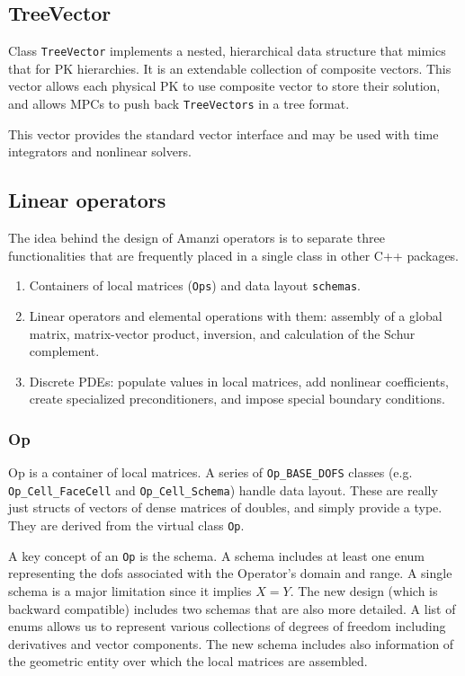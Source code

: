 \subsection{TreeVector}
Class {\tt TreeVector} implements a nested, hierarchical data structure 
that mimics that for PK hierarchies.
It is an extendable collection of composite vectors.
This vector allows each physical PK to use composite vector to store 
their solution, and allows MPCs to push back {\tt TreeVectors} in a tree format.

This vector provides the standard vector interface and may be used with
time integrators and nonlinear solvers.


\subsection{Linear operators}
The idea behind the design of Amanzi operators is to separate three 
functionalities that are frequently placed in a single class in other
C++ packages.

\begin{enumerate}
\item Containers of local matrices ({\tt Ops}) and data layout {\tt schemas}.

\item Linear operators and elemental operations with them: assembly of a global 
      matrix, matrix-vector product, inversion, and calculation of the Schur complement.

\item Discrete PDEs: populate values in local matrices, add nonlinear 
coefficients, create specialized preconditioners, and impose special
boundary conditions. 
\end{enumerate}


\subsubsection{Op}
Op is a container of local matrices.
A series of {\tt Op\_BASE\_DOFS} classes (e.g. {\tt Op\_Cell\_FaceCell} and 
{\tt Op\_Cell\_Schema}) handle data layout. 
These are really just structs of vectors of
dense matrices of doubles, and simply provide a type.
They are derived from the virtual class {\tt Op}.

A key concept of an {\tt Op} is the schema. 
A schema includes at least one enum representing the dofs associated
with the Operator's domain and range. A single schema is a major limitation 
since it implies $X=Y$.
The new design (which is backward compatible) includes two schemas that are also more 
detailed. A list of enums allows us to represent various collections of 
degrees of freedom including derivatives and vector components.
The new schema includes also information of the geometric entity over which the local 
matrices are assembled.

